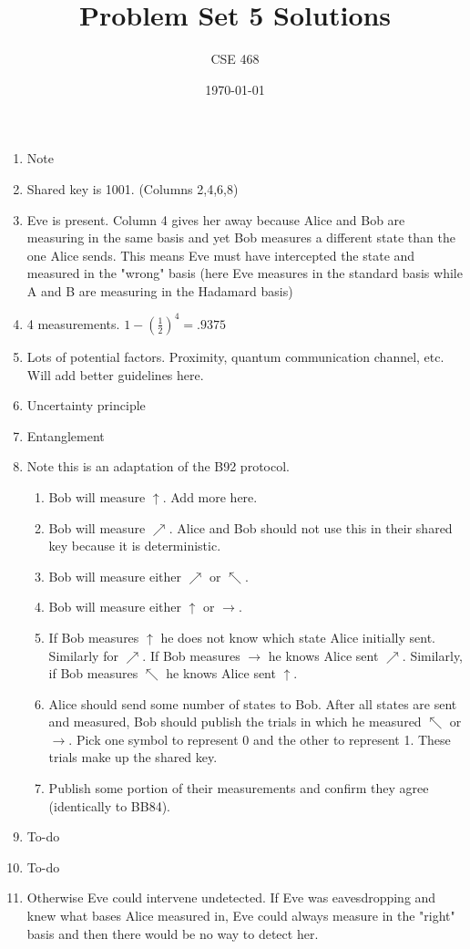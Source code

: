 \documentclass[12pt]{article}
\title{Problem Set 5 Solutions}
\author{CSE 468}
\date{\today}
\begin{document}
\maketitle

\begin{enumerate}[font=\bfseries]
    \item Note
    \item Shared key is 1001. (Columns 2,4,6,8)
    \item Eve is present. Column 4 gives her away because Alice and Bob are measuring in the same basis and yet Bob measures a different state than the one Alice sends. This means Eve must have intercepted the state and measured in the "wrong" basis (here Eve measures in the standard basis while A and B are measuring in the Hadamard basis)
    \item 4 measurements. $1 - (\frac{1}{2})^4 = .9375$
    \item Lots of potential factors. Proximity, quantum communication channel, etc. Will add better guidelines here.
    \item Uncertainty principle
    \item Entanglement
    \item Note this is an adaptation of the B92 protocol.
        \begin{enumerate}
            \item Bob will measure $\uparrow$. Add more here.
            \item Bob will measure $\nearrow$. Alice and Bob should not use this in their shared key because it is deterministic.
            \item Bob will measure either $\nearrow$ or $\nwarrow$.
            \item Bob will measure either $\uparrow$ or $\rightarrow$.
            \item If Bob measures $\uparrow$ he does not know which state Alice initially sent. Similarly for $\nearrow$. If Bob measures $\rightarrow$ he knows Alice sent $\nearrow$. Similarly, if Bob measures $\nwarrow$ he knows Alice sent $\uparrow$.
            \item Alice should send some number of states to Bob.  After all states are sent and measured, Bob should publish the trials in which he measured $\nwarrow$ or $\rightarrow$. Pick one symbol to represent 0 and the other to represent 1. These trials make up the shared key.
            \item Publish some portion of their measurements and confirm they agree (identically to BB84). 
        \end{enumerate}
    \item To-do
    \item To-do
    \item Otherwise Eve could intervene undetected. If Eve was eavesdropping and knew what bases Alice measured in, Eve could always measure in the "right" basis and then there would be no way to detect her.
\end{enumerate}
\end{document}

